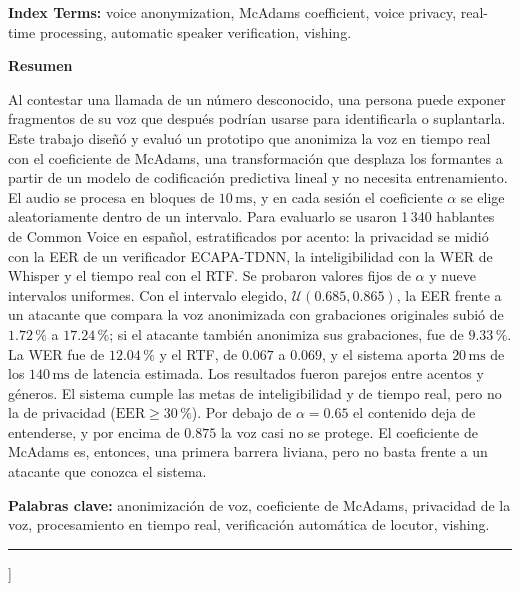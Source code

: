 \documentclass[10pt,twocolumn]{article}
\begin{document}
\begin{@twocolumnfalse}
\vspace{5pt}
\noindent\textbf{Index Terms:} voice anonymization, McAdams coefficient, voice privacy, real-time processing, automatic speaker verification, vishing.\par

\vspace{10pt}
\noindent\textbf{Resumen}\par
\vspace{4pt}

\noindent Al contestar una llamada de un número desconocido, una persona puede exponer fragmentos de su voz que después podrían usarse para identificarla o suplantarla. Este trabajo diseñó y evaluó un prototipo que anonimiza la voz en tiempo real con el coeficiente de McAdams, una transformación que desplaza los formantes a partir de un modelo de codificación predictiva lineal y no necesita entrenamiento. El audio se procesa en bloques de $10\,\mathrm{ms}$, y en cada sesión el coeficiente $\alpha$ se elige aleatoriamente dentro de un intervalo. Para evaluarlo se usaron 1\,340 hablantes de Common Voice en español, estratificados por acento: la privacidad se midió con la EER de un verificador ECAPA-TDNN, la inteligibilidad con la WER de Whisper y el tiempo real con el RTF. Se probaron valores fijos de $\alpha$ y nueve intervalos uniformes. Con el intervalo elegido, $\mathcal{U}(0.685,0.865)$, la EER frente a un atacante que compara la voz anonimizada con grabaciones originales subió de $1.72\,\%$ a $17.24\,\%$; si el atacante también anonimiza sus grabaciones, fue de $9.33\,\%$. La WER fue de $12.04\,\%$ y el RTF, de $0.067$ a $0.069$, y el sistema aporta $20\,\mathrm{ms}$ de los $140\,\mathrm{ms}$ de latencia estimada. Los resultados fueron parejos entre acentos y géneros. El sistema cumple las metas de inteligibilidad y de tiempo real, pero no la de privacidad ($\mathrm{EER}\geq 30\,\%$). Por debajo de $\alpha=0.65$ el contenido deja de entenderse, y por encima de $0.875$ la voz casi no se protege. El coeficiente de McAdams es, entonces, una primera barrera liviana, pero no basta frente a un atacante que conozca el sistema.

\vspace{5pt}
\noindent\textbf{Palabras clave:} anonimización de voz, coeficiente de McAdams, privacidad de la voz, procesamiento en tiempo real, verificación automática de locutor, vishing.\par


\vspace{6pt}\rule{\textwidth}{0.4pt}\vspace{8pt}
\end{@twocolumnfalse}
]
\end{document}
